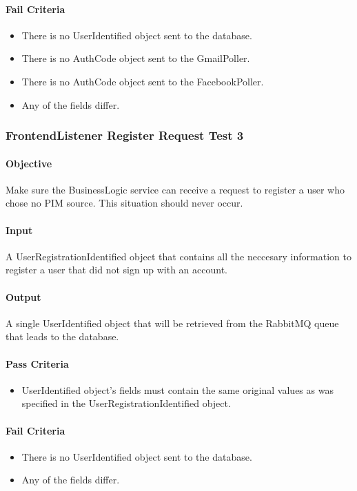 \documentclass[hidelinks,english]{article}
\begin{document}
				\paragraph{Fail Criteria}
				\begin{itemize}
					\item There is no UserIdentified object sent to the database.
					\item There is no AuthCode object sent to the GmailPoller.
					\item There is no AuthCode object sent to the FacebookPoller.
					\item Any of the fields differ.
				\end{itemize}
			
			\subsubsection{FrontendListener Register Request Test 3}\label{businessfrontendlistenerregistertest3}
				\paragraph{Objective} Make sure the BusinessLogic service can receive a request to register a user who chose no PIM source. This situation should never occur.
				\paragraph{Input} A UserRegistrationIdentified object that contains all the neccesary information to register a user that did not sign up with an account.
				\paragraph{Output} A single UserIdentified object that will be retrieved from the RabbitMQ queue that leads to the database.
				\paragraph{Pass Criteria}
				\begin{itemize}
					\item UserIdentified object's fields must contain the same original values as was specified in the UserRegistrationIdentified object.
				\end{itemize}
				\paragraph{Fail Criteria}
				\begin{itemize}
					\item There is no UserIdentified object sent to the database.
					\item Any of the fields differ.
				\end{itemize}
			
\end{document}
